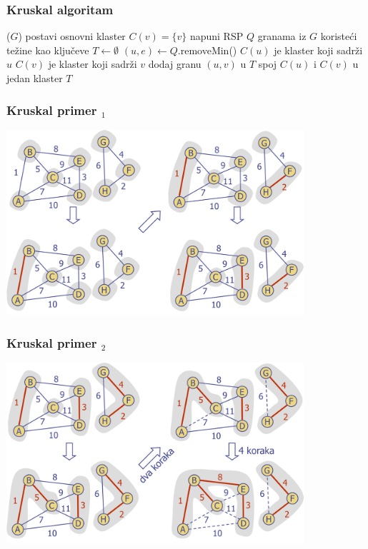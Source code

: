 \documentclass[compress]{beamer}
\begin{document}
\begin{frame}[fragile,shrink=2]
  \frametitle{Kruskal algoritam}
  \begin{algorithmic}
    \STATE {}($G$)
      \STATE postavi osnovni klaster $C(v) = \{v\}$
    \ENDFOR
    \STATE napuni RSP $Q$ granama iz $G$ koristeći težine kao ključeve
    \STATE $T \leftarrow \emptyset$
      \STATE $(u,e) \leftarrow Q$.removeMin()
      \STATE $C(u)$ je klaster koji sadrži $u$
      \STATE $C(v)$ je klaster koji sadrži $v$
        \STATE dodaj granu $(u,v)$ u $T$
        \STATE spoj $C(u)$ i $C(v)$ u jedan klaster
      \ENDIF
    \ENDWHILE
    \RETURN $T$
  \end{algorithmic}
\end{frame}

\begin{frame}[fragile]
  \frametitle{Kruskal primer $_1$}
  \begin{center}
    \includegraphics[width=11cm]{asp-14-pic74.png}
  \end{center}
\end{frame}

\begin{frame}[fragile]
  \frametitle{Kruskal primer $_2$}
  \begin{center}
    \includegraphics[width=11cm]{asp-14-pic75.png}
  \end{center}
\end{frame}
\end{document}
